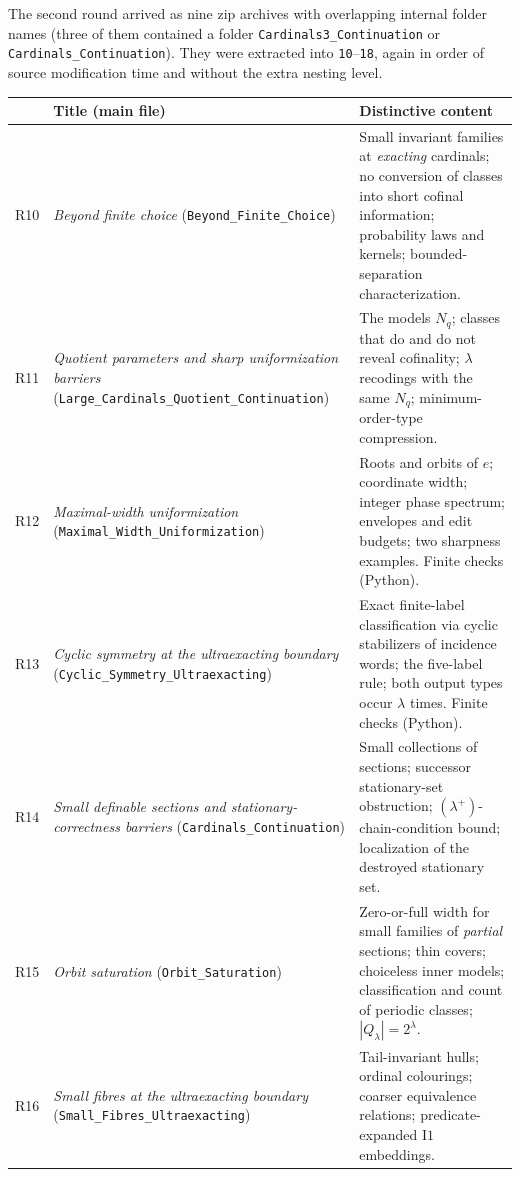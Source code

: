 \documentclass[11pt,letterpaper]{article}
\theoremstyle{definition}
\numberwithin{equation}{section}
\newcommand{\R}[1]{\textsf{R#1}}
\begin{document}
The second round arrived as nine zip archives with overlapping internal folder names (three of them contained a folder \nolinkurl{Cardinals3_Continuation} or \nolinkurl{Cardinals_Continuation}). They were extracted into \nolinkurl{10}--\nolinkurl{18}, again in order of source modification time and without the extra nesting level.

\begin{center}
\small
\renewcommand{\arraystretch}{1.18}
\begin{tabularx}{\textwidth}{@{}lP{.33\textwidth}Y@{}}
\toprule
&\textbf{Title (main file)}&\textbf{Distinctive content}\\\midrule
\R{10}&\emph{Beyond finite choice} (\nolinkurl{Beyond_Finite_Choice})&Small invariant families at \emph{exacting} cardinals; no conversion of classes into short cofinal information; probability laws and kernels; bounded-separation characterization.\\
\R{11}&\emph{Quotient parameters and sharp uniformization barriers} (\nolinkurl{Large_Cardinals_Quotient_Continuation})&The models $N_q$; classes that do and do not reveal cofinality; $\lambda$ recodings with the same $N_q$; minimum-order-type compression.\\
\R{12}&\emph{Maximal-width uniformization} (\nolinkurl{Maximal_Width_Uniformization})&Roots and orbits of $e$; coordinate width; integer phase spectrum; envelopes and edit budgets; two sharpness examples. Finite checks (Python).\\
\R{13}&\emph{Cyclic symmetry at the ultraexacting boundary} (\nolinkurl{Cyclic_Symmetry_Ultraexacting})&Exact finite-label classification via cyclic stabilizers of incidence words; the five-label rule; both output types occur $\lambda$ times. Finite checks (Python).\\
\R{14}&\emph{Small definable sections and stationary-correctness barriers} (\nolinkurl{Cardinals_Continuation})&Small collections of sections; successor stationary-set obstruction; $(\lambda^+)$-chain-condition bound; localization of the destroyed stationary set.\\
\R{15}&\emph{Orbit saturation} (\nolinkurl{Orbit_Saturation})&Zero-or-full width for small families of \emph{partial} sections; thin covers; choiceless inner models; classification and count of periodic classes; $|Q_\lambda|=2^\lambda$.\\
\R{16}&\emph{Small fibres at the ultraexacting boundary} (\nolinkurl{Small_Fibres_Ultraexacting})&Tail-invariant hulls; ordinal colourings; coarser equivalence relations; predicate-expanded $\mathrm{I1}$ embeddings.\\

\end{tabularx}
\end{center}
\end{document}
